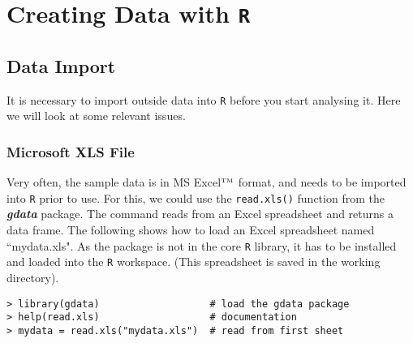 \documentclass[a4paper,12pt]{article}
\begin{document}
\section{Creating Data with \texttt{R}}

\subsection{Data Import}
It is necessary to import outside data into \texttt{R} before you start analysing it. Here we will look at some relevant issues.

\subsubsection{Microsoft XLS File}
Very often, the sample data is in MS Excel$^{\mbox{\tiny{TM}}}$ format, and needs to be imported into \texttt{R} prior to use. For this, we could use the \texttt{read.xls()} function from the \textbf{\textit{gdata}} package. The command reads from an Excel spreadsheet and returns a data frame. The following shows how to load an Excel spreadsheet named ``mydata.xls". As the package is not in the core \texttt{R} library, it has to be installed and loaded into the \texttt{R} workspace. (This spreadsheet is saved in the working directory).
\begin{verbatim}
> library(gdata)                   # load the gdata package
> help(read.xls)                   # documentation
> mydata = read.xls("mydata.xls")  # read from first sheet
\end{verbatim}











\end{document}

